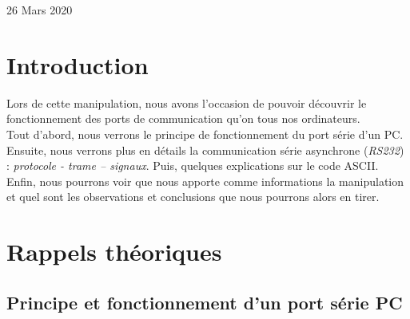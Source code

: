 \documentclass[a4paper]{article}
\begin{document}
\begin{titlepage}
\begin{sffamily}
\begin{center}
            {\large 26 Mars 2020}
        \end{center}
    \end{sffamily}
\end{titlepage}







\let\cleardoublepage\clearpage















\section{Introduction}





Lors de cette manipulation, nous avons l'occasion de pouvoir découvrir le fonctionnement des ports de communication qu'on tous nos ordinateurs.\\
Tout d'abord, nous verrons le principe de fonctionnement du port série d'un PC. Ensuite, nous verrons plus en détails la communication série asynchrone (\emph{RS232}) : \emph{protocole - trame – signaux}. Puis, quelques explications sur le code ASCII. Enfin, nous pourrons voir que nous apporte comme informations la manipulation et quel sont les observations et conclusions  que nous pourrons alors en tirer.















\section{Rappels théoriques}










\subsection{Principe et fonctionnement d’un port série PC}
\end{document}

